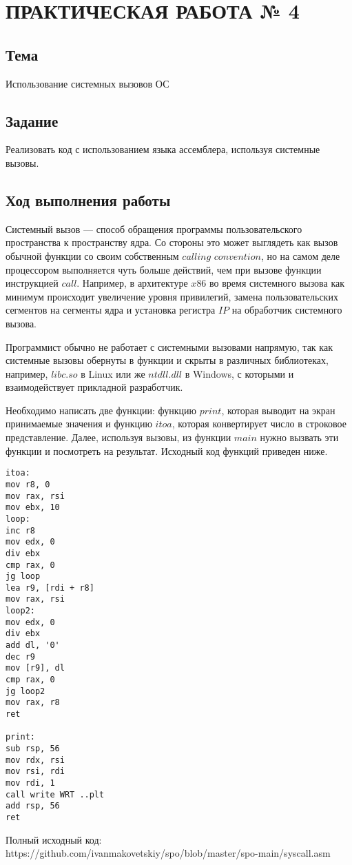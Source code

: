 \chapter{ПРАКТИЧЕСКАЯ РАБОТА № 4}

\section{Тема}

Использование системных вызовов ОС

\section{Задание}

Реализовать код с использованием языка ассемблера, используя системные вызовы.

\section{Ход выполнения работы}

Системный вызов --- способ обращения программы пользовательского пространства к пространству ядра. Со стороны это может выглядеть как вызов обычной функции со своим собственным $calling$ $convention$, но на самом деле процессором выполняется чуть больше действий, чем при вызове функции инструкцией $call$. Например, в архитектуре $x86$ во время системного вызова как минимум происходит увеличение уровня привилегий, замена пользовательских сегментов на сегменты ядра и установка регистра $IP$ на обработчик системного вызова.

Программист обычно не работает с системными вызовами напрямую, так как системные вызовы обернуты в функции и скрыты в различных библиотеках, например, $libc.so$ в Linux или же $ntdll.dll$ в Windows, с которыми и взаимодействует прикладной разработчик.

Необходимо написать две функции: функцию $print$, которая выводит на экран принимаемые значения и функцию $itoa$, которая конвертирует число в строковое представление. Далее, используя вызовы, из функции $main$ нужно вызвать эти функции и посмотреть на результат. Исходный код функций приведен ниже. 

\begin{Verbatim}
itoa:
mov r8, 0
mov rax, rsi
mov ebx, 10
loop:
inc r8
mov edx, 0
div ebx
cmp rax, 0
jg loop
lea r9, [rdi + r8]
mov rax, rsi
loop2:
mov edx, 0
div ebx
add dl, '0'
dec r9
mov [r9], dl
cmp rax, 0
jg loop2
mov rax, r8
ret

print:
sub rsp, 56
mov rdx, rsi
mov rsi, rdi
mov rdi, 1
call write WRT ..plt
add rsp, 56
ret
\end{Verbatim}

Полный исходный код: https://github.com/ivanmakovetskiy/spo/blob/master/spo-main/syscall.asm
